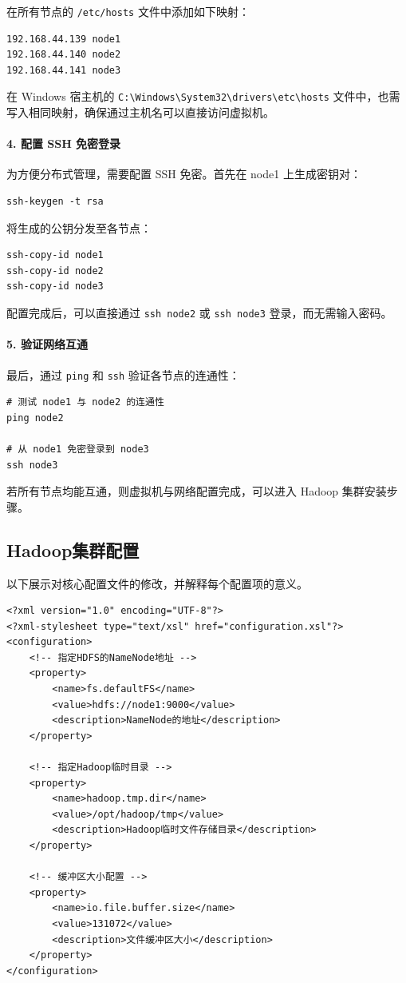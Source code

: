\documentclass[]{bitreport}
\begin{document}
在所有节点的 \texttt{/etc/hosts} 文件中添加如下映射：
\begin{lstlisting}[style=shell]
192.168.44.139 node1
192.168.44.140 node2
192.168.44.141 node3
\end{lstlisting}

在 Windows 宿主机的 \texttt{C:\textbackslash Windows\textbackslash System32\textbackslash drivers\textbackslash etc\textbackslash hosts} 文件中，也需写入相同映射，确保通过主机名可以直接访问虚拟机。

\paragraph{4. 配置 SSH 免密登录}
为方便分布式管理，需要配置 SSH 免密。首先在 node1 上生成密钥对：
\begin{lstlisting}[style=shell]
ssh-keygen -t rsa
\end{lstlisting}

将生成的公钥分发至各节点：
\begin{lstlisting}[style=shell]
ssh-copy-id node1
ssh-copy-id node2
ssh-copy-id node3
\end{lstlisting}

配置完成后，可以直接通过 \texttt{ssh node2} 或 \texttt{ssh node3} 登录，而无需输入密码。

\paragraph{5. 验证网络互通}
最后，通过 \texttt{ping} 和 \texttt{ssh} 验证各节点的连通性：
\begin{lstlisting}[style=shell]
# 测试 node1 与 node2 的连通性
ping node2

# 从 node1 免密登录到 node3
ssh node3
\end{lstlisting}

若所有节点均能互通，则虚拟机与网络配置完成，可以进入 Hadoop 集群安装步骤。

\subsection{Hadoop集群配置}

以下展示对核心配置文件的修改，并解释每个配置项的意义。

\begin{lstlisting}[style=xml, caption={core-site.xml核心配置}]
<?xml version="1.0" encoding="UTF-8"?>
<?xml-stylesheet type="text/xsl" href="configuration.xsl"?>
<configuration>
    <!-- 指定HDFS的NameNode地址 -->
    <property>
        <name>fs.defaultFS</name>
        <value>hdfs://node1:9000</value>
        <description>NameNode的地址</description>
    </property>
    
    <!-- 指定Hadoop临时目录 -->
    <property>
        <name>hadoop.tmp.dir</name>
        <value>/opt/hadoop/tmp</value>
        <description>Hadoop临时文件存储目录</description>
    </property>
    
    <!-- 缓冲区大小配置 -->
    <property>
        <name>io.file.buffer.size</name>
        <value>131072</value>
        <description>文件缓冲区大小</description>
    </property>
</configuration>
\end{lstlisting}
\end{document}
